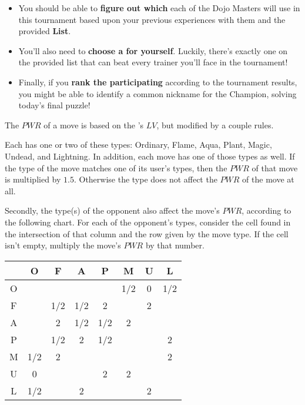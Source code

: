 \begin{itemize}
  \item You should be able to \textbf{figure out which \mappMobimon{}} each of
        the Dojo Masters will use in this tournament
        based upon your previous experiences with them and the provided
        \textbf{\mappMobimon{} List}.
  \item You'll also need to \textbf{choose a \mappMobimon{} for yourself}.
        Luckily, there's exactly one \mappMobimon{} on the provided list that
        can beat every trainer you'll face in the tournament!
  \item Finally, if you \textbf{rank the participating \mappMobimon{}} according
        to the tournament results, you might be able to identify a common
        nickname for the \mappMobimon{} Champion, solving today's final
        puzzle!
\end{itemize}



The \(PWR\) of a \mappMobimon{} move is based on the
\mappMobimon{}'s \(LV\), but modified by a couple rules.

Each \mappMobimon{} has one or two of these types: Ordinary, Flame, Aqua, Plant,
Magic, Undead, and Lightning. In addition, each \mappMobimon{} move has one
of those types as well. If the type of the move matches one of its user's
types, then the \(PWR\) of that move is multiplied by \(1.5\). Otherwise
the \mappMobimon{} type does not affect the \(PWR\) of the move at all.

Secondly, the type(s) of the opponent \mappMobimon{} also affect the move's
\(PWR\), according to the following chart.
For each of the opponent's types, consider the cell found in the
intersection of that column and the row given by the move type. If the cell
isn't empty, multiply the move's \(PWR\) by that number.

\begin{center}
\begin{tabular}{c||c|c|c|c|c|c|c|}
     &  O  &  F  &  A  &  P  &  M  &  U  &  L  \\\hline\hline
  O  &     &     &     &     & 1/2 &  0  & 1/2 \\\hline
  F  &     & 1/2 & 1/2 &  2  &     &  2  &     \\\hline
  A  &     &  2  & 1/2 & 1/2 &  2  &     &     \\\hline
  P  &     & 1/2 &  2  & 1/2 &     &     &  2  \\\hline
  M  & 1/2 &  2  &     &     &     &     &  2  \\\hline
  U  &  0  &     &     &  2  &  2  &     &     \\\hline
  L  & 1/2 &     &  2  &     &     &  2  &     \\\hline
\end{tabular}
\end{center}

